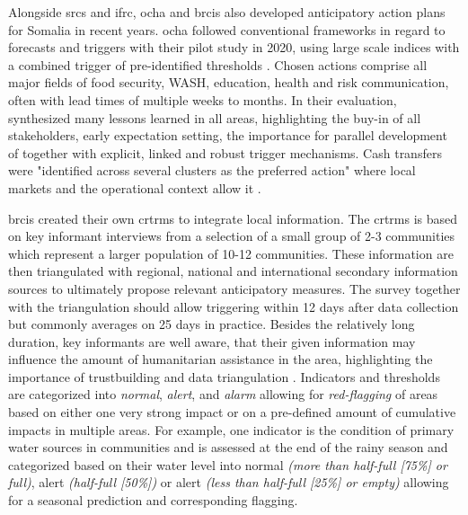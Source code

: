 Alongside \acrshort{srcs} and \acrshort{ifrc}, \acrshort{ocha} and \acrshort{brcis} also developed anticipatory action plans for Somalia in recent years. \acrshort{ocha} followed conventional frameworks in regard to forecasts and triggers with their pilot study in 2020, using large scale indices with a combined trigger of pre-identified thresholds \autocite{gettliffeOCHAAnticipatoryAction2021,ochaANTICIPATORYACTIONPLAN2020}. Chosen actions comprise all major fields of food security, WASH, education, health and risk communication, often with lead times of multiple weeks to months. In their evaluation, \textcite{gettliffeOCHAAnticipatoryAction2021} synthesized many lessons learned in all areas, highlighting the buy-in of all stakeholders, early expectation setting, the importance for parallel development of  together with explicit, linked and robust trigger mechanisms. Cash transfers were "identified across several clusters as the preferred action" \autocite[21]{ochaANTICIPATORYACTIONPLAN2020} where local markets and the operational context allow it \autocites{gettliffeOCHAAnticipatoryAction2021,}.

\acrshort{brcis} created their own \acrfull{crtrms} to integrate local information. The \acrshort{crtrms} is based on key informant interviews from a selection of a small group of 2-3 communities which represent a larger population of 10-12 communities. These information are then triangulated with regional, national and international secondary information sources to ultimately propose relevant anticipatory measures. The survey together with the triangulation should allow triggering within 12 days after data collection but commonly averages on 25 days in practice. Besides the relatively long duration, key informants are well aware, that their given information may influence the amount of humanitarian assistance in the area, highlighting the importance of trustbuilding and data triangulation \autocite{gualazziniEWEAEarlyWarning2021}.\newline
Indicators and thresholds are categorized into \textit{normal}, \textit{alert}, and \textit{alarm} allowing for \textit{red-flagging} of areas based on either one very strong impact or on a pre-defined amount of cumulative impacts in multiple areas. For example, one indicator is the condition of primary water sources in communities and is assessed at the end of the rainy season and categorized based on their water level into normal \textit{(more than half-full [75\%] or full)}, alert \textit{(half-full [50\%])} or alert \textit{(less than half-full [25\%] or empty)} allowing for a seasonal prediction and corresponding flagging.

